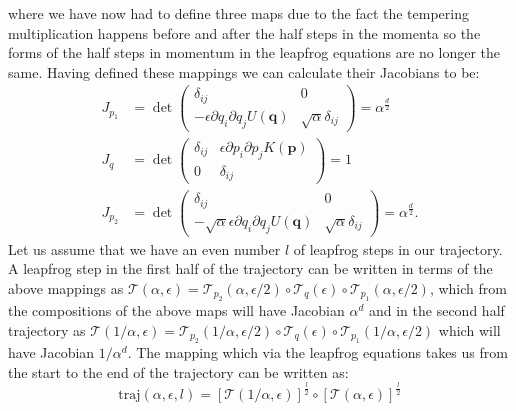 \documentclass[12pt]{article}
\begin{document}
    where we have now had to define three maps due to the fact the tempering multiplication happens before and after the half steps in the momenta so the forms of the half steps in momentum in the leapfrog equations are no longer the same. Having defined these mappings we can calculate their Jacobians to be:
    \begin{align}
        J_{p_1} & = \det\begin{pmatrix} \delta_{ij} & 0 \\ -\epsilon\partial q_i \partial q_j U\left(\bm{q}\right) & \sqrt{\alpha}\delta_{ij} \end{pmatrix} = \alpha^\frac{d}{2} \\
        J_{q} & = \det\begin{pmatrix} \delta_{ij} & \epsilon\partial p_i \partial p_j K\left(\bm{p}\right) \\ 0 & \delta_{ij} \end{pmatrix} = 1 \\
        J_{p_2} & = \det\begin{pmatrix} \delta_{ij} & 0 \\ -\sqrt{\alpha}\epsilon\partial q_i \partial q_j U\left(\bm{q}\right) & \sqrt{\alpha}\delta_{ij} \end{pmatrix} = \alpha^\frac{d}{2}.
    \end{align}
    Let us assume that we have an even number $l$ of leapfrog steps in our trajectory. A leapfrog step in the first half of the trajectory can be written in terms of the above mappings as $\mathcal{T}\left(\alpha,\epsilon\right) = \mathcal{T}_{p_2}\left(\alpha,\epsilon/2\right)\circ\mathcal{T}_q\left(\epsilon\right)\circ\mathcal{T}_{p_1}\left(\alpha,\epsilon/2\right)$, which from the compositions of the above maps will have Jacobian $ \alpha^d $ and in the second half trajectory as $\mathcal{T}\left(1/\alpha,\epsilon\right) = \mathcal{T}_{p_2}\left(1/\alpha,\epsilon/2\right)\circ\mathcal{T}_q\left(\epsilon\right)\circ\mathcal{T}_{p_1}\left(1/\alpha,\epsilon/2\right)$ which will have Jacobian $1/\alpha^{d}$. The mapping which via the leapfrog equations takes us from the start to the end of the trajectory can be written as:
    \begin{equation}
        \text{traj}\left(\alpha,\epsilon,l\right)=\left[\mathcal{T}\left(1/\alpha,\epsilon\right)\right]^{\frac{l}{2}}\circ\left[\mathcal{T}\left(\alpha,\epsilon\right)\right]^{\frac{l}{2}}
    \end{equation}
\end{document}
